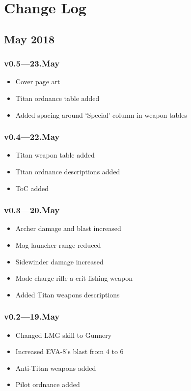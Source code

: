 \documentclass[9pt, openany]{extbook}
\begin{document}
\chapter{Change Log}
\label{changelog}
{\small

\section{May 2018}

\subsection{v0.5---23.May}
\begin{itemize}[noitemsep]
\item Cover page art
\item Titan ordnance table added
\item Added spacing around `Special' column in weapon tables
\end{itemize}

\subsection{v0.4---22.May}
\begin{itemize}[noitemsep]
\item Titan weapon table added
\item Titan ordnance descriptions added
\item ToC added
\end{itemize}


\subsection{v0.3---20.May}
\begin{itemize}[noitemsep]
\item Archer damage and blast increased
\item Mag launcher range reduced
\item Sidewinder damage increased
\item Made charge rifle a crit fishing weapon
\item Added Titan weapons descriptions
\end{itemize}


\subsection{v0.2---19.May}
\begin{itemize}[noitemsep]
\item Changed LMG skill to Gunnery
\item Increased EVA-8's blast from 4 to 6
\item Anti-Titan weapons added
\item Pilot ordnance added
\end{itemize}


}
\end{document}
